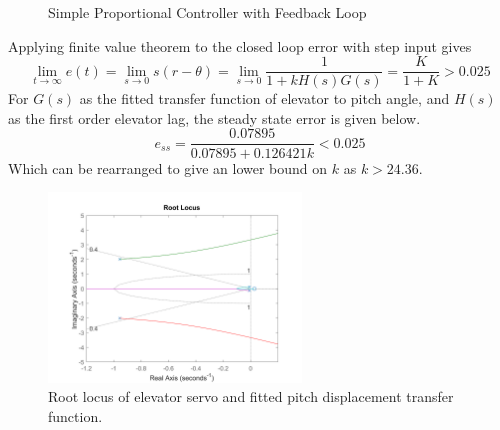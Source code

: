 \documentclass{article}
\begin{document}
\begin{figure}[H]
    \begin{center}
    \end{center}
    \caption{Simple Proportional Controller with Feedback Loop}\label{fig}
\end{figure}

Applying finite value theorem to the closed loop error with step input gives
\begin{equation}
    \lim_{t \to \infty} e(t) = \lim_{s \to 0} s (r - \theta) = \lim_{s \to 0} \frac{1}{1+kH(s)G(s)} = \frac{K}{1+K} > 0.025
\end{equation}
For $G(s)$ as the fitted transfer function of elevator to pitch angle, and $H(s)$ as the first order elevator lag, the steady state error is given below.
\begin{equation}
    e_{ss} = \frac{0.07895}{0.07895 + 0.126421 k} < 0.025
\end{equation}
Which can be rearranged to give an lower bound on $k$ as $k > 24.36$.

\begin{figure}[H]
    \centering
    \includegraphics[width=0.6\textwidth]{figures/pitch_autopilot_locus_bad.png}
    \caption{Root locus of elevator servo and fitted pitch displacement transfer function.}
    \label{fig:fitted_pitchrate_rlocus}
\end{figure}
\end{document}
